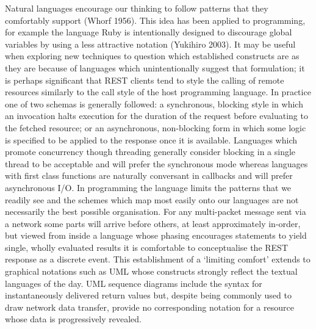 \documentclass[12pt, ]{article}
\begin{document}
Natural languages encourage our thinking to follow patterns that they
comfortably support (Whorf 1956). This idea has been applied to
programming, for example the language Ruby is intentionally designed to
discourage global variables by using a less attractive notation
(Yukihiro 2003). It may be useful when exploring new techniques to
question which established constructs are as they are because of
languages which unintentionally suggest that formulation; it is perhaps
significant that REST clients tend to style the calling of remote
resources similarly to the call style of the host programming language.
In practice one of two schemas is generally followed: a synchronous,
blocking style in which an invocation halts execution for the duration
of the request before evaluating to the fetched resource; or an
asynchronous, non-blocking form in which some logic is specified to be
applied to the response once it is available. Languages which promote
concurrency though threading generally consider blocking in a single
thread to be acceptable and will prefer the synchronous mode whereas
languages with first class functions are naturally conversant in
callbacks and will prefer asynchronous I/O. In programming the language
limits the patterns that we readily see and the schemes which map most
easily onto our languages are not necessarily the best possible
organisation. For any multi-packet message sent via a network some parts
will arrive before others, at least approximately in-order, but viewed
from inside a language whose phasing encourages statements to yield
single, wholly evaluated results it is comfortable to conceptualise the
REST response as a discrete event. This establishment of a `limiting
comfort' extends to graphical notations such as UML whose constructs
strongly reflect the textual languages of the day. UML sequence diagrams
include the syntax for instantaneously delivered return values but,
despite being commonly used to draw network data transfer, provide no
corresponding notation for a resource whose data is progressively
revealed.
\end{document}
